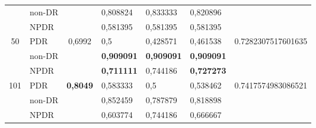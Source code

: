 \begin{table}[hbtp]
\begin{center}
\begin{tabular}{|c|l|c|l|l|l|c|}
			& non-DR                                             &                          & 0,808824                                          & 0,833333                                         & 0,820896                                        &                                      \\ \cline{2-2} \cline{4-6}
			& NPDR                                               &                          & 0,581395                                          & 0,581395                                         & 0,581395                                        &                                      \\ \cline{2-2} \cline{4-6}
			\multirow{-3}{*}{50}  & PDR                                                & \multirow{-3}{*}{0,6992} & 0,5                                               & 0,428571                                         & 0,461538                                        & \multirow{-3}{*}{0.7282307517601635} \\ \hline
			& non-DR                                             &                          & \textbf{0,909091}                                          & \textbf{0,909091}                                         & \textbf{0,909091}                                        &                                      \\ \cline{2-2} \cline{4-6}
			& NPDR                                               &                          & \textbf{0,711111}                                          & 0,744186                                         & \textbf{0,727273}                                        &                                      \\ \cline{2-2} \cline{4-6}
			\multirow{-3}{*}{101} & PDR                                                & \multirow{-3}{*}{\textbf{0,8049}} & 0,583333                                          & 0,5                                              & 0,538462                                        & \multirow{-3}{*}{0.7417574983086521} \\ \hline
			& non-DR                                             &                          & 0,852459                                          & 0,787879                                         & 0,818898                                        &                                      \\ \cline{2-2} \cline{4-6}
			& NPDR                                               &                          & 0,603774                                          & 0,744186                                         & 0,666667                                        &                                      \\ \cline{2-2} \cline{4-6}

\end{tabular}
\end{center}
\end{table}
